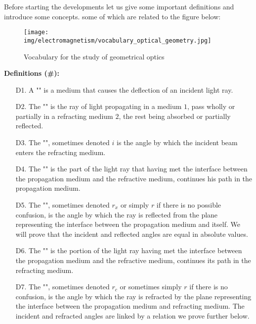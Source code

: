 	Before starting the developments let us give some important definitions and introduce some concepts. some of which are related to the figure below:
	\begin{figure}[H]
		\centering
		\texttt{[image: img/electromagnetism/vocabulary\_optical\_geometry.jpg]}
		\caption{Vocabulary for the study of geometrical optics}
	\end{figure}
	
	\pagebreak
	\textbf{Definitions (\#\mydef):} 
	\begin{enumerate}
		\item[D1.] A "" is a medium that causes the deflection of an incident light ray.
		
		\item[D2.] The "" is the ray of light propagating in a medium $1$, pass wholly or partially in a refracting medium $2$, the rest being absorbed or partially reflected.
		
		\item[D3.] The "", sometimes denoted $i$ is the angle by which the incident beam enters the refracting medium.
		
		\item[D4.] The "" is the part of the light ray that having met the interface between the propagation medium and the refractive medium, continues his path in the propagation medium.
		
		\item[D5.] The "", sometimes denoted $r_x$ or simply $r$ if there is no possible confusion, is the angle by which the ray is reflected from the plane representing the interface between the propagation medium and itself. We will prove that the incident and reflected angles are equal in absolute values.
		
		\item[D6.] The "" is the portion of the light ray having met the interface between the propagation medium and the refractive medium, continues its path in the refracting medium.
		
		\item[D7.] The "", sometimes denoted $r_c$ or sometimes simply $r$ if there is no confusion, is the angle by which the ray is refracted by the plane representing the interface between the propagation medium and refracting medium. The incident and refracted angles are linked by a relation we prove further below.
	\end{enumerate}
